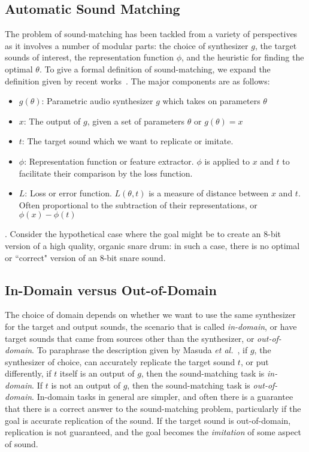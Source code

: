 \subsection{Automatic Sound Matching}
\label{sec:sound_matching_definition}
The problem of sound-matching has been tackled from a variety of perspectives as it involves a number of modular parts: the choice of synthesizer $g$, the target sounds of interest, the representation function $\phi$, and the heuristic for finding the optimal $\theta$. To give a formal definition of sound-matching, we expand the definition given by recent works~\cite{vahidi2023mesostructures,han2023perceptual}. The major components are as follows: 
\begin{itemize}
    \item $g(\theta)$: Parametric audio synthesizer $g$ which takes on parameters $\theta$ 
    \item $x$: The output of $g$, given a set of parameters $\theta$ or $g(\theta) = x$ 
    \item $t$: The target sound which we want to replicate or imitate. 
    \item $\phi$: Representation function or feature extractor. $\phi$ is applied to $x$ and $t$ to facilitate their comparison by the loss function.
    \item $L$: Loss or error function. $L(\theta,t)$ is a measure of distance between $x$ and $t$. Often proportional to the subtraction of their representations, or $ \phi(x) - \phi(t)$
\end{itemize}

. Consider the hypothetical case where the goal might be to create an 8-bit~\cite{collins2007loop} version of a high quality, organic snare drum: in such a case, there is no optimal or ``correct" version of an 8-bit snare sound. 

\subsection{In-Domain versus Out-of-Domain}
\label{sec:in-domain}
The choice of domain depends on whether we want to use the same synthesizer for the target and output sounds, the scenario that is called \textit{in-domain}, or have target sounds that came from sources other than the synthesizer, or \textit{out-of-domain}. To paraphrase the description given by Masuda \textit{et al.}~\cite{masuda2021soundmatch}, if $g$, the synthesizer of choice, can accurately replicate the target sound $t$, or put differently, if $t$ itself is an output of $g$, then the sound-matching task is \textit{in-domain}. If $t$ is not an output of $g$, then the sound-matching task is \textit{out-of-domain}. In-domain tasks in general are simpler, and often there is a guarantee that there is a correct answer to the sound-matching problem, particularly if the goal is accurate replication of the sound. If the target sound is out-of-domain, replication is not guaranteed, and the goal becomes the \textit{imitation} of some aspect of sound. 

